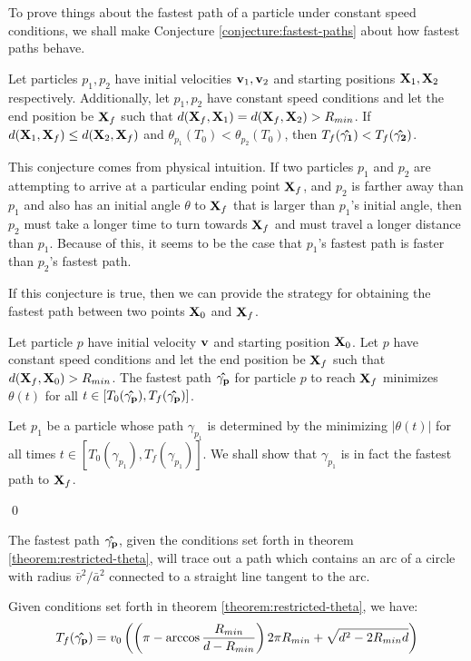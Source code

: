 To prove things about the fastest path of a particle under constant speed conditions, we shall make Conjecture \ref{conjecture:fastest-paths} about how fastest paths behave.

\begin{conjecture}
  \label{conjecture:fastest-paths}
  Let particles $p_1, p_2$ have initial velocities $\mathbf{v}_1, \mathbf{v}_2$ and starting positions $\mathbf{X}_1, \mathbf{X}_2$ respectively. Additionally, let $p_1, p_2$ have constant speed conditions and let the end position be $\mathbf{X}_f$ such that $d(\mathbf{X}_f, \mathbf{X}_1) = d(\mathbf{X}_f, \mathbf{X}_2) > R_{min}$. If $d(\mathbf{X}_1, \mathbf{X}_f) \leq d(\mathbf{X}_2, \mathbf{X}_f)$ and $\theta_{p_1}(T_0) < \theta_{p_2}(T_0)$, then $T_f(\mathbf{\hat{\gamma_1}}) < T_f(\mathbf{\hat{\gamma_2}})$.
\end{conjecture}

This conjecture comes from physical intuition. If two particles $p_1$ and $p_2$ are attempting to arrive at a particular ending point $\mathbf{X}_f$, and $p_2$ is farther away than $p_1$ and also has an initial angle $\theta$ to $\mathbf{X}_f$ that is larger than $p_1$'s initial angle, then $p_2$ must take a longer time to turn towards $\mathbf{X}_f$ and must travel a longer distance than $p_1$. Because of this, it seems to be the case that $p_1$'s fastest path is faster than $p_2$'s fastest path.

If this conjecture is true, then we can provide the strategy for obtaining the fastest path between two points $\mathbf{X}_0$ and $\mathbf{X}_f$.

\begin{theorem}
  Let particle $p$ have initial velocity $\mathbf{v}$ and starting position $\mathbf{X}_0$. Let $p$ have constant speed conditions and let the end position be $\mathbf{X}_f$ such that $d(\mathbf{X}_f, \mathbf{X}_0) > R_{min}$. The fastest path $\mathbf{\hat{\gamma_p}}$ for particle $p$ to reach $\mathbf{X}_f$ minimizes $\theta(t)$ for all $t \in [T_0(\mathbf{\hat{\gamma_p}}), T_f(\mathbf{\hat{\gamma_p}})]$.
  \label{theorem:restricted-theta}
\end{theorem}
\proof Let $p_1$ be a particle whose path $\gamma_{p_1}$ is determined by the minimizing $|\theta(t)|$ for all times $t \in [T_0(\gamma_{p_1}), T_f(\gamma_{p_1})]$. We shall show that $\gamma_{p_1}$ is in fact the fastest path to $\mathbf{X}_f$.

\qed

\begin{corollary}
  The fastest path $\mathbf{\hat{\gamma_p}}$, given the conditions set forth in theorem \ref{theorem:restricted-theta}, will trace out a path which contains an arc of a circle with radius $\bar{v}^2 / \bar{a}^2$ connected to a straight line tangent to the arc.
\end{corollary}

\begin{corollary}
  Given conditions set forth in theorem \ref{theorem:restricted-theta}, we have:
  \begin{eqnarray}
    T_f(\mathbf{\hat{\gamma_p}}) = v_0 \left( \left( \pi - \arccos \frac{R_{min}}{d - R_{min}} \right) 2 \pi R_{min}  + \sqrt{d^2 - 2 R_{min} d}  \right)
  \end{eqnarray}
\end{corollary}

